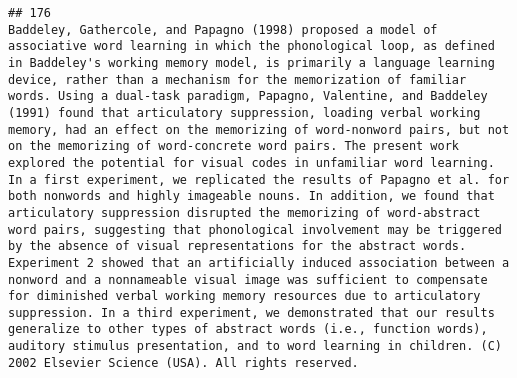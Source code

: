\documentclass[
  english,
  man]{apa6}
\begin{document}
\begin{verbatim}
## 176                                                                                                                                                                                                                                                                                                                                                                                                                                                                                                                                                                                                                                                                                                                                                                                                                                                                                                                                                                                                                                                                                                                                                                                                          Baddeley, Gathercole, and Papagno (1998) proposed a model of associative word learning in which the phonological loop, as defined in Baddeley's working memory model, is primarily a language learning device, rather than a mechanism for the memorization of familiar words. Using a dual-task paradigm, Papagno, Valentine, and Baddeley (1991) found that articulatory suppression, loading verbal working memory, had an effect on the memorizing of word-nonword pairs, but not on the memorizing of word-concrete word pairs. The present work explored the potential for visual codes in unfamiliar word learning. In a first experiment, we replicated the results of Papagno et al. for both nonwords and highly imageable nouns. In addition, we found that articulatory suppression disrupted the memorizing of word-abstract word pairs, suggesting that phonological involvement may be triggered by the absence of visual representations for the abstract words. Experiment 2 showed that an artificially induced association between a nonword and a nonnameable visual image was sufficient to compensate for diminished verbal working memory resources due to articulatory suppression. In a third experiment, we demonstrated that our results generalize to other types of abstract words (i.e., function words), auditory stimulus presentation, and to word learning in children. (C) 2002 Elsevier Science (USA). All rights reserved.

\end{verbatim}
\end{document}
